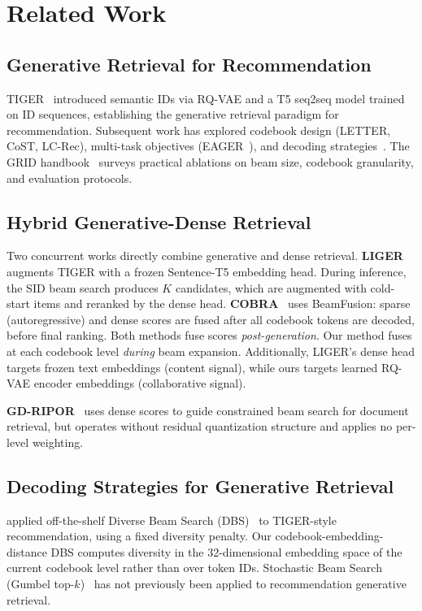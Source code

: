 \section{Related Work}
\label{sec:related}

\subsection{Generative Retrieval for Recommendation}

TIGER~\cite{rajput2023tiger} introduced semantic IDs via RQ-VAE and a T5 seq2seq model trained on ID sequences, establishing the generative retrieval paradigm for recommendation. Subsequent work has explored codebook design (LETTER, CoST, LC-Rec), multi-task objectives (EAGER~\cite{wang2024eager}), and decoding strategies~\cite{penha2024bridging}. The GRID handbook~\cite{ju2025grid} surveys practical ablations on beam size, codebook granularity, and evaluation protocols.

\subsection{Hybrid Generative-Dense Retrieval}

Two concurrent works directly combine generative and dense retrieval. \textbf{LIGER}~\cite{yang2024liger} augments TIGER with a frozen Sentence-T5 embedding head. During inference, the SID beam search produces $K$ candidates, which are augmented with cold-start items and reranked by the dense head. \textbf{COBRA}~\cite{yang2025cobra} uses BeamFusion: sparse (autoregressive) and dense scores are fused after all codebook tokens are decoded, before final ranking. Both methods fuse scores \emph{post-generation}. Our method fuses at each codebook level \emph{during} beam expansion. Additionally, LIGER's dense head targets frozen text embeddings (content signal), while ours targets learned RQ-VAE encoder embeddings (collaborative signal).

\textbf{GD-RIPOR}~\cite{zeng2024gdripor} uses dense scores to guide constrained beam search for document retrieval, but operates without residual quantization structure and applies no per-level weighting.

\subsection{Decoding Strategies for Generative Retrieval}

\citet{penha2024bridging} applied off-the-shelf Diverse Beam Search (DBS)~\cite{vijayakumar2016dbs} to TIGER-style recommendation, using a fixed diversity penalty. Our codebook-embedding-distance DBS computes diversity in the 32-dimensional embedding space of the current codebook level rather than over token IDs. Stochastic Beam Search (Gumbel top-$k$)~\cite{kool2019stochastic} has not previously been applied to recommendation generative retrieval.

